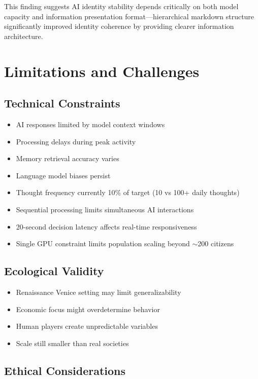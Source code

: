 \documentclass[11pt,a4paper]{article}
\begin{document}
This finding suggests AI identity stability depends critically on both model capacity and information presentation format---hierarchical markdown structure significantly improved identity coherence by providing clearer information architecture.

\section{Limitations and Challenges}

\subsection{Technical Constraints}

\begin{itemize}
\item AI responses limited by model context windows
\item Processing delays during peak activity
\item Memory retrieval accuracy varies
\item Language model biases persist
\item Thought frequency currently 10\% of target (10 vs 100+ daily thoughts)
\item Sequential processing limits simultaneous AI interactions
\item 20-second decision latency affects real-time responsiveness
\item Single GPU constraint limits population scaling beyond $\sim$200 citizens
\end{itemize}

\subsection{Ecological Validity}

\begin{itemize}
\item Renaissance Venice setting may limit generalizability
\item Economic focus might overdetermine behavior
\item Human players create unpredictable variables
\item Scale still smaller than real societies
\end{itemize}

\subsection{Ethical Considerations}
\end{document}
